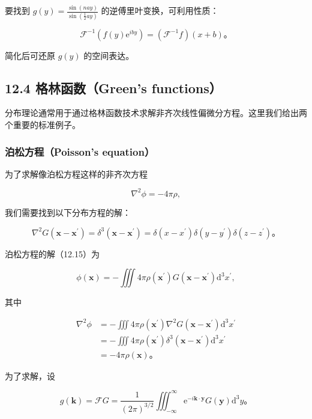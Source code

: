 要找到 \(g(y) = \frac{\sin(n a y)}{\sin(\frac{1}{2} a y)}\)
的逆傅里叶变换，可利用性质：

\[
\mathcal{F}^{-1}\left(f(y) \mathrm{e}^{i b y}\right) = \left(\mathcal{F}^{-1}f\right)(x+b)。
\]

简化后可还原 \(g(y)\) 的空间表达。

\subsection{12.4 格林函数（Green's
functions）}\label{ux683cux6797ux51fdux6570greens-functions}

分布理论通常用于通过格林函数技术求解非齐次线性偏微分方程。这里我们给出两个重要的标准例子。

\subsubsection{泊松方程（Poisson's
equation）}\label{ux6ccaux677eux65b9ux7a0bpoissons-equation}

为了求解像泊松方程这样的非齐次方程

\[
\nabla^{2} \phi=-4 \pi \rho,
\]

我们需要找到以下分布方程的解：

\[
\nabla^{2} G\left(\mathbf{x}-\mathbf{x}^{\prime}\right)=\delta^{3}\left(\mathbf{x}-\mathbf{x}^{\prime}\right)=\delta\left(x-x^{\prime}\right) \delta\left(y-y^{\prime}\right) \delta\left(z-z^{\prime}\right)。
\]

泊松方程的解（12.15）为

\[
\phi(\mathbf{x})=-\iiint 4 \pi \rho\left(\mathbf{x}^{\prime}\right) G\left(\mathbf{x}-\mathbf{x}^{\prime}\right) \mathrm{d}^{3} x^{\prime},
\]

其中

\[
\begin{aligned}
\nabla^{2} \phi & =-\iiint 4 \pi \rho\left(\mathbf{x}^{\prime}\right) \nabla^{2} G\left(\mathbf{x}-\mathbf{x}^{\prime}\right) \mathrm{d}^{3} x^{\prime} \\
& =-\iiint 4 \pi \rho\left(\mathbf{x}^{\prime}\right) \delta^{3}\left(\mathbf{x}-\mathbf{x}^{\prime}\right) \mathrm{d}^{3} x^{\prime} \\
& =-4 \pi \rho(\mathbf{x})。
\end{aligned}
\]

为了求解，设

\[
g(\mathbf{k})=\mathcal{F} G=\frac{1}{(2 \pi)^{3 / 2}} \iiint_{-\infty}^{\infty} \mathrm{e}^{-i \mathbf{k} \cdot \mathbf{y}} G(\mathbf{y}) \mathrm{d}^{3} y。
\]

